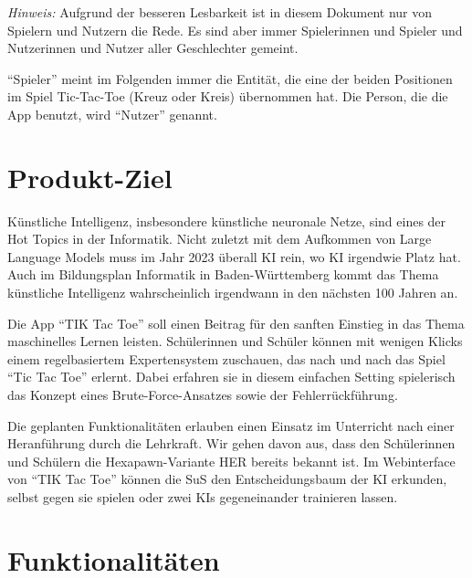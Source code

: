 \documentclass[titlepage]{scrartcl}
\title{\TicTacToe}
\subtitle{Product Backlog}
\date{Stand: \today}
\author{Jonas, Luis, Leonid}
\newcommand{\TicTacToe}{TI\reflectbox K Tac Toe}
\begin{document}
\maketitle

\emph{Hinweis:} Aufgrund der besseren Lesbarkeit ist in diesem Dokument nur von Spielern und Nutzern die Rede.
Es sind aber immer Spielerinnen und Spieler und Nutzerinnen und Nutzer aller Geschlechter gemeint.

"`Spieler"' meint im Folgenden immer die Entität, die eine der beiden Positionen im Spiel Tic-Tac-Toe (Kreuz oder Kreis) übernommen hat.
Die Person, die die App benutzt, wird "`Nutzer"' genannt.

\section{Produkt-Ziel}%
Künstliche Intelligenz, insbesondere künstliche neuronale Netze, sind eines der Hot Topics in der Informatik.
Nicht zuletzt mit dem Aufkommen von Large Language Models muss im Jahr 2023 überall KI rein, wo KI irgendwie Platz hat.
Auch im Bildungsplan Informatik in Baden-Württemberg kommt das Thema künstliche Intelligenz wahrscheinlich irgendwann in den nächsten 100 Jahren an.

Die App "`\TicTacToe"' soll einen Beitrag für den sanften Einstieg in das Thema maschinelles Lernen leisten.
Schülerinnen und Schüler können mit wenigen Klicks einem regelbasiertem Expertensystem zuschauen, das nach und nach das Spiel "`Tic Tac Toe"' erlernt.
Dabei erfahren sie in diesem einfachen Setting spielerisch das Konzept eines Brute-Force-Ansatzes sowie der Fehlerrückführung.

Die geplanten Funktionalitäten erlauben einen Einsatz im Unterricht nach einer Heranführung durch die Lehrkraft.
Wir gehen davon aus, dass den Schülerinnen und Schülern die Hexapawn-Variante HER bereits bekannt ist.
Im Webinterface von "`\TicTacToe"' können die SuS den Entscheidungsbaum der KI erkunden, selbst gegen sie spielen oder zwei KIs gegeneinander trainieren lassen.



\section{Funktionalitäten}%
\end{document}
